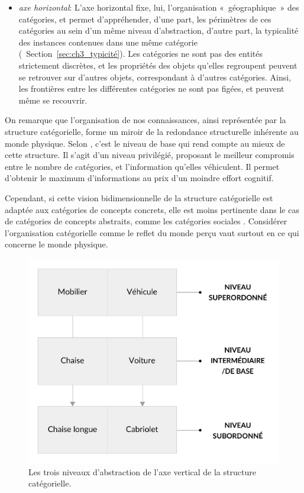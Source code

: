 \begin{itemize}
\item \textit{axe horizontal}: L'axe horizontal fixe, lui, l'organisation «~géographique~» des catégories, et permet d'appréhender, d'une part, les périmètres de ces catégories au sein d'un même niveau d'abstraction, d'autre part, la typicalité des instances contenues dans une même catégorie (\cf~Section~\ref{sec:ch3_typicité}). Les catégories ne sont pas des entités strictement discrètes, et les propriétés des objets qu'elles regroupent peuvent se retrouver sur d'autres objets, correspondant à d'autres catégories. Ainsi, les frontières entre les différentes catégories ne sont pas figées, et peuvent même se recouvrir.
\end{itemize}

On remarque que l'organisation de nos connaissances, ainsi représentée par la structure catégorielle, forme un miroir de la redondance structurelle inhérente au monde physique. Selon \citep[p. 28]{rosch1978cognition}, c'est le niveau de base qui rend compte au mieux de cette structure. Il s'agit d'un niveau privilégié, proposant le meilleur compromis entre le nombre de catégories, et l'information qu'elles véhiculent. Il permet d'obtenir le maximum d'informations au prix d'un moindre effort cognitif.

Cependant, si cette vision bidimensionnelle de la structure catégorielle est adaptée aux catégories de concepts concrets, elle est moins pertinente dans le cas de catégories de concepts abstraits, comme les catégories sociales \citep[p. 72-88]{dubois1991semantique}. Considérer l'organisation catégorielle comme le reflet du monde perçu vaut surtout en ce qui concerne le monde physique.

\begin{figure}[t]
        \myfloatalign
        \includegraphics[width=.6\linewidth]{gfx/ch_3/categorieLVL}
        \caption{Les trois niveaux d'abstraction de l'axe vertical de la structure catégorielle.}\label{fig:categorieLVL}
\end{figure}

